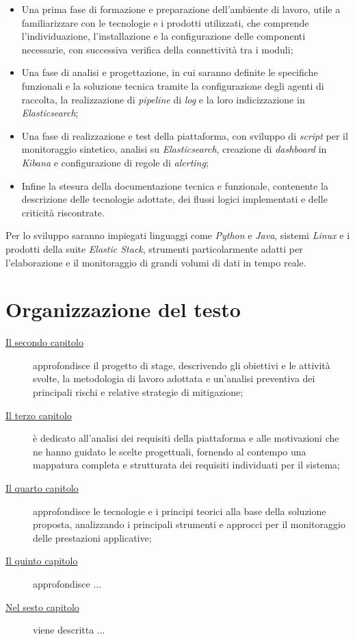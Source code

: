 \begin{itemize}
    \item Una prima fase di formazione e preparazione dell'ambiente di lavoro, utile a familiarizzare con le tecnologie e i prodotti utilizzati, che comprende l'individuazione, l'installazione e la configurazione delle componenti necessarie, con successiva verifica della connettività tra i moduli;
    \item Una fase di analisi e progettazione, in cui saranno definite le specifiche funzionali e la soluzione tecnica tramite la configurazione degli agenti di raccolta, la realizzazione di \emph{pipeline} di \emph{log} e la loro indicizzazione in \emph{Elasticsearch};
    \item Una fase di realizzazione e test della piattaforma, con sviluppo di \emph{script} per il monitoraggio sintetico, analisi su \emph{Elasticsearch}, creazione di \emph{dashboard} in \emph{Kibana} e configurazione di regole di \emph{alerting};
    \item Infine la stesura della documentazione tecnica e funzionale, contenente la descrizione delle tecnologie adottate, dei flussi logici implementati e delle criticità riscontrate.
\end{itemize}

Per lo sviluppo saranno impiegati linguaggi come \emph{Python} e \emph{Java}, sistemi \emph{Linux} e i prodotti della suite \emph{Elastic Stack}, strumenti particolarmente adatti per l'elaborazione e il monitoraggio di grandi volumi di dati in tempo reale.


\section{Organizzazione del testo}

\begin{description}
    \item[{\hyperref[cap:descrizione-stage]{Il secondo capitolo}}] approfondisce il progetto di stage, descrivendo gli obiettivi e le attività svolte, la metodologia di lavoro adottata e un'analisi preventiva dei principali rischi e relative strategie di mitigazione;

    \item[{\hyperref[cap:analisi-requisiti]{Il terzo capitolo}}] è dedicato all'analisi dei requisiti della piattaforma e alle motivazioni che ne hanno guidato le scelte progettuali, fornendo al contempo una mappatura completa e strutturata dei requisiti individuati per il sistema;

    \item[{\hyperref[cap:tecnologie-principi-teorici]{Il quarto capitolo}}] approfondisce le tecnologie e i principi teorici alla base della soluzione proposta, analizzando i principali strumenti e approcci per il monitoraggio delle prestazioni applicative;
    
    \item[{\hyperref[cap:verifica-validazione]{Il quinto capitolo}}] approfondisce ...
    
    \item[{\hyperref[cap:conclusioni]{Nel sesto capitolo}}] viene descritta ...
\end{description}

